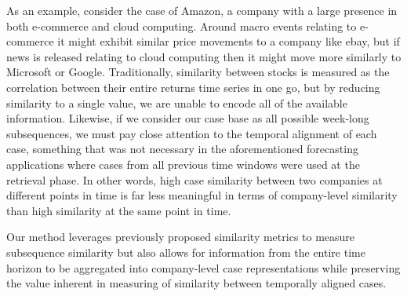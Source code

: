 As an example, consider the case of Amazon, a company with a large presence in both e-commerce and cloud computing. Around macro events relating to e-commerce it might exhibit similar price movements to a company like ebay, but if news is released relating to cloud computing then it might move more similarly to Microsoft or Google. Traditionally, similarity between stocks is measured as the correlation between their entire returns time series in one go, but by reducing similarity to a single value, we are unable to encode all of the available information. Likewise, if we consider our case base as all possible week-long subsequences, we must pay close attention to the temporal alignment of each case, something that was not necessary in the aforementioned forecasting applications where cases from all previous time windows were used at the retrieval phase. In other words, high case similarity between two companies at different points in time is far less meaningful in terms of company-level similarity than high similarity at the same point in time.

Our method leverages previously proposed similarity metrics to measure subsequence similarity but also allows for information from the entire time horizon to be aggregated into company-level case representations while preserving the value inherent in measuring of similarity between temporally aligned cases.